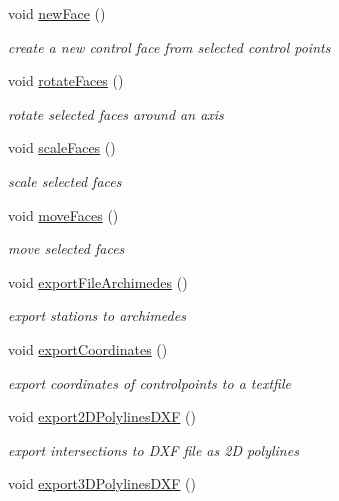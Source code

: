 \begin{DoxyCompactItemize}
void \hyperlink{classShipCAD_1_1Controller_ad2bc80eb2e8445e335709804120e80f8}{new\-Face} ()
\begin{DoxyCompactList}\small\item\em create a new control face from selected control points \end{DoxyCompactList}\item 
void \hyperlink{classShipCAD_1_1Controller_a288d168e5160d0409d5e4472e2ad1d5b}{rotate\-Faces} ()
\begin{DoxyCompactList}\small\item\em rotate selected faces around an axis \end{DoxyCompactList}\item 
void \hyperlink{classShipCAD_1_1Controller_a5f14267f3c2906bfaf755536efaeea18}{scale\-Faces} ()
\begin{DoxyCompactList}\small\item\em scale selected faces \end{DoxyCompactList}\item 
void \hyperlink{classShipCAD_1_1Controller_ac7aabbfcf700269dc82610c73a129c03}{move\-Faces} ()
\begin{DoxyCompactList}\small\item\em move selected faces \end{DoxyCompactList}\item 
void \hyperlink{classShipCAD_1_1Controller_a3c229cc7b4660933229250ba77e197f7}{export\-File\-Archimedes} ()
\begin{DoxyCompactList}\small\item\em export stations to archimedes \end{DoxyCompactList}\item 
void \hyperlink{classShipCAD_1_1Controller_a3a36570218825d074f256ee3650c5a8b}{export\-Coordinates} ()
\begin{DoxyCompactList}\small\item\em export coordinates of controlpoints to a textfile \end{DoxyCompactList}\item 
void \hyperlink{classShipCAD_1_1Controller_a7941ff51b66de58b883d2b0f46003af9}{export2\-D\-Polylines\-D\-X\-F} ()
\begin{DoxyCompactList}\small\item\em export intersections to D\-X\-F file as 2\-D polylines \end{DoxyCompactList}\item 
void \hyperlink{classShipCAD_1_1Controller_a2a54e6215052d6a06d1119a84d2f7d85}{export3\-D\-Polylines\-D\-X\-F} ()

\end{DoxyCompactItemize}
